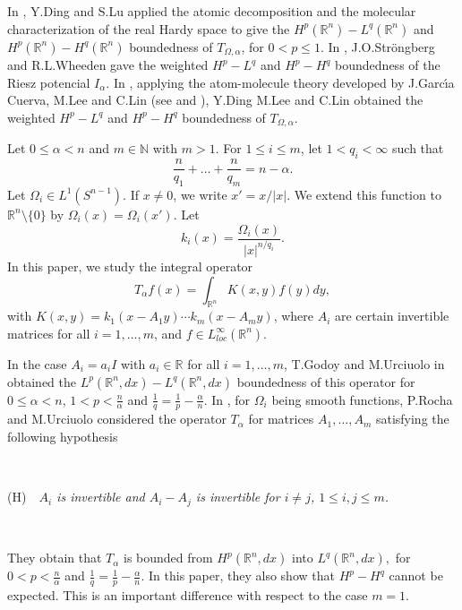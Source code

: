 \documentclass[a4paper,12pt,reqno]{amsart}
\numberwithin{equation}{section}
\begin{document}
	In \cite{DL2}, Y.\@ Ding and S.\@ Lu applied the atomic decomposition and the molecular characterization of the real Hardy space to give the $H^p(\mathbb{R}^n)-L^q(\mathbb{R}^n)$ and  $H^p(\mathbb{R}^n)-H^q(\mathbb{R}^n)$ boundedness of $T_{\Omega, \alpha}$, for $0< p\leq 1$. In \cite{SW}, J.\@ O.\@ Str\"{o}ngberg and R.\@ L.\@ Wheeden gave the weighted $H^p-L^q$ and $H^p-H^q$ boundedness of the Riesz potencial $I_\alpha$.
	In \cite{DLeLi}, applying the atom-molecule theory developed  by J.\@ Garc\'{\i}a Cuerva, M.\@ Lee and C.\@ Lin (see \cite{GC} and \cite{LeLi}), Y.\@ Ding  M.\@ Lee and C.\@ Lin obtained the weighted  $H^p-L^q$ and $H^p-H^q$ boundedness of $T_{\Omega, \alpha}$.
	
	Let $0\leq \alpha<n$ and  $m\in \mathbb{N}$ with $m>1$. For  $1\leq i\leq m$,  let  $1<q_i<\infty$ such that 
	\begin{equation}\label{q_i}
		\frac n{q_1}+\dots+\frac n{q_m}=n-\alpha.
	\end{equation}
	Let $\Omega _i\in L^1(S^{n-1})$. If
	$x\neq 0$, we write $x'=x/|x|$. We extend this function to $\mathbb{R}^n\setminus\{0\}$ by $\Omega_i(x)=\Omega_i(x')$.
	Let  \begin{equation}\label{ki} k_i(x)=\frac{\Omega_i(x)}{|x|^{n/q_i}}.\end{equation}
	In this paper, we  study the integral operator
	\begin{equation}\label{operador}
		T_\alpha f(x)=\int_{\mathbb{R}^{n}}K(x,y) f(y)dy,
	\end{equation}
	with $K(x,y)=k_1( x-A_1y)\cdots k_m( x-A_my)$,
	where $A_{i}$ are certain invertible matrices for all $i=1,\ldots,m$,
	and $f\in L^\infty_{loc}(\mathbb{R}^n)$.
	
	In the case  $A_i=a_iI$ with $a_i\in \mathbb{R}$ for all $i=1,\ldots, m$,  T.\@ Godoy and M.\@ Urciuolo in \cite{GU2}  obtained  the $L^p(\mathbb{R}^{n},dx)-L^q(\mathbb{R}^{n}, dx)$ boundedness of this operator for $0\leq \alpha < n$, $1 < p <\frac n\alpha$ and $\frac 1q=\frac 1p-\frac \alpha n$. In \cite{RoU}, for  $\Omega _i$ being smooth functions, P.\@ Rocha and M.\@ Urciuolo considered the operator $T_\alpha$ for  matrices $A_1,\dots, A_m$ satisfying the following hypothesis
	
	\
	
	
	(H)\ \ \emph {$A_{i}$  is invertible and  $A_i-A_j$ is invertible for $i\not = j$, $1\leq i, j\leq m$.}
	
	
	\
	
	
	\noindent They obtain that $T_\alpha$ is  bounded from $H^{p}(\mathbb{R}^{n},dx)$ into $L^{q}(\mathbb{R}%
	^{n},dx),$ for $0<p<\frac{n}{\alpha}$ and $\frac{1}{q}=\frac{1}{p}-\frac{\alpha }{n}$.  
	In this paper, they also show that $H^p-H^q$ cannot be expected. This is an important difference with respect to the case $m=1$.
	
\end{document}
